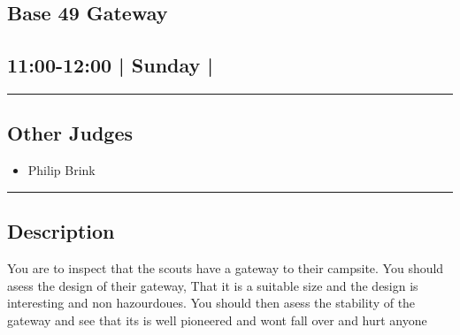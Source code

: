 \documentclass[10pt, A5]{article}
\begin{document}
	

		\begin{framed}
			\begin{minipage}{\textwidth}

			\setcounter{section}{106}
							\section{\faStar \: Base 49 \faStar \: Gateway}
						
			\subsection*{11:00-12:00 | Sunday | }

			\vspace{0.25cm}
			\hrule
			\vspace{0.25cm}


			\subsection*{Other Judges}
							

				\begin{multicols}{2}

			\begin{itemize}
											\item Philip Brink
								\end{itemize}

			\vfill\null
			\columnbreak

			\begin{itemize}
								\end{itemize}

			\vfill\null

			\end{multicols}

			\vspace{0.25cm}
			\hrule
			\vspace{0.25cm}

			\begin{minipage}{\textwidth}
			\subsection*{\faListAlt \: Description}
			You are to inspect that the scouts have a gateway to their campsite. You should asess the design of their gateway, That it is a suitable size and the design is interesting and non hazourdoues. You should then asess the stability of the gateway and see that its is well pioneered and wont fall over and hurt anyone
			\end{minipage}


	\end{minipage}
	\end{framed}
\end{document}
